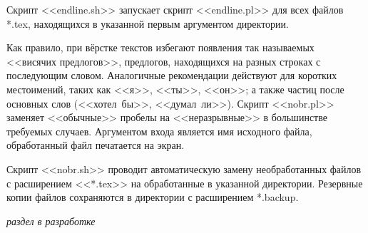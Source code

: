 Скрипт <<endline.sh>> запускает скрипт <<endline.pl>> для всех файлов *.tex, находящихся в указанной первым аргументом директории.


Как правило, при вёрстке текстов избегают появления так называемых <<висячих предлогов>>, \ie предлогов, находящихся на разных строках с последующим словом.
Аналогичные рекомендации действуют для коротких местоимений, таких как <<я>>, <<ты>>, <<он>>; а также частиц после основных слов (<<хотел~бы>>, <<думал~ли>>).
Скрипт <<nobr.pl>> заменяет <<обычные>> пробелы на <<неразрывные>> в большинстве требуемых случаев.
Аргументом входа является имя исходного файла, обработанный файл печатается на экран.

Скрипт <<nobr.sh>> проводит автоматическую замену необработанных файлов с расширением <<*.tex>> на обработанные в указанной директории.
Резервные копии файлов сохраняются в директории с расширением *.backup.

\emph{раздел в разработке}




